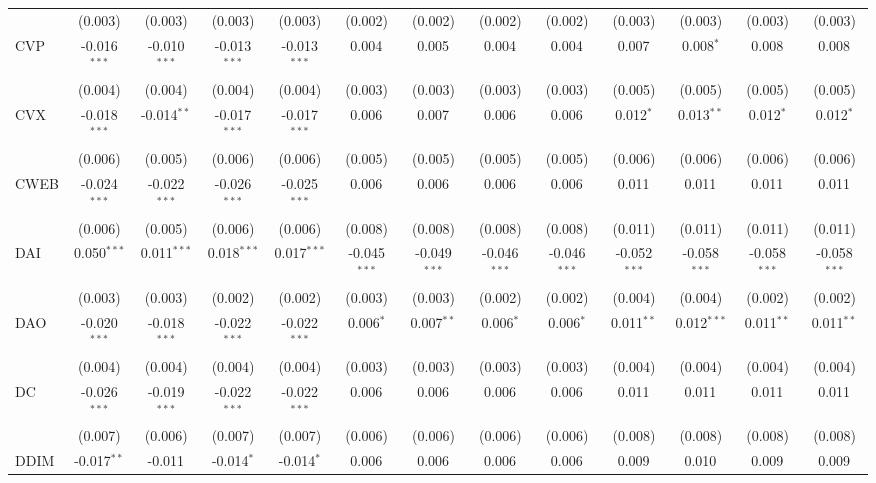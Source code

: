 \begin{table}[!htbp]
\begin{tabular}{@{\extracolsep{5pt}}lcccccccccccc}
  & (0.003) & (0.003) & (0.003) & (0.003) & (0.002) & (0.002) & (0.002) & (0.002) & (0.003) & (0.003) & (0.003) & (0.003) \\
 CVP & -0.016$^{***}$ & -0.010$^{***}$ & -0.013$^{***}$ & -0.013$^{***}$ & 0.004$^{}$ & 0.005$^{}$ & 0.004$^{}$ & 0.004$^{}$ & 0.007$^{}$ & 0.008$^{*}$ & 0.008$^{}$ & 0.008$^{}$ \\
  & (0.004) & (0.004) & (0.004) & (0.004) & (0.003) & (0.003) & (0.003) & (0.003) & (0.005) & (0.005) & (0.005) & (0.005) \\
 CVX & -0.018$^{***}$ & -0.014$^{**}$ & -0.017$^{***}$ & -0.017$^{***}$ & 0.006$^{}$ & 0.007$^{}$ & 0.006$^{}$ & 0.006$^{}$ & 0.012$^{*}$ & 0.013$^{**}$ & 0.012$^{*}$ & 0.012$^{*}$ \\
  & (0.006) & (0.005) & (0.006) & (0.006) & (0.005) & (0.005) & (0.005) & (0.005) & (0.006) & (0.006) & (0.006) & (0.006) \\
 CWEB & -0.024$^{***}$ & -0.022$^{***}$ & -0.026$^{***}$ & -0.025$^{***}$ & 0.006$^{}$ & 0.006$^{}$ & 0.006$^{}$ & 0.006$^{}$ & 0.011$^{}$ & 0.011$^{}$ & 0.011$^{}$ & 0.011$^{}$ \\
  & (0.006) & (0.005) & (0.006) & (0.006) & (0.008) & (0.008) & (0.008) & (0.008) & (0.011) & (0.011) & (0.011) & (0.011) \\
 DAI & 0.050$^{***}$ & 0.011$^{***}$ & 0.018$^{***}$ & 0.017$^{***}$ & -0.045$^{***}$ & -0.049$^{***}$ & -0.046$^{***}$ & -0.046$^{***}$ & -0.052$^{***}$ & -0.058$^{***}$ & -0.058$^{***}$ & -0.058$^{***}$ \\
  & (0.003) & (0.003) & (0.002) & (0.002) & (0.003) & (0.003) & (0.002) & (0.002) & (0.004) & (0.004) & (0.002) & (0.002) \\
 DAO & -0.020$^{***}$ & -0.018$^{***}$ & -0.022$^{***}$ & -0.022$^{***}$ & 0.006$^{*}$ & 0.007$^{**}$ & 0.006$^{*}$ & 0.006$^{*}$ & 0.011$^{**}$ & 0.012$^{***}$ & 0.011$^{**}$ & 0.011$^{**}$ \\
  & (0.004) & (0.004) & (0.004) & (0.004) & (0.003) & (0.003) & (0.003) & (0.003) & (0.004) & (0.004) & (0.004) & (0.004) \\
 DC & -0.026$^{***}$ & -0.019$^{***}$ & -0.022$^{***}$ & -0.022$^{***}$ & 0.006$^{}$ & 0.006$^{}$ & 0.006$^{}$ & 0.006$^{}$ & 0.011$^{}$ & 0.011$^{}$ & 0.011$^{}$ & 0.011$^{}$ \\
  & (0.007) & (0.006) & (0.007) & (0.007) & (0.006) & (0.006) & (0.006) & (0.006) & (0.008) & (0.008) & (0.008) & (0.008) \\
 DDIM & -0.017$^{**}$ & -0.011$^{}$ & -0.014$^{*}$ & -0.014$^{*}$ & 0.006$^{}$ & 0.006$^{}$ & 0.006$^{}$ & 0.006$^{}$ & 0.009$^{}$ & 0.010$^{}$ & 0.009$^{}$ & 0.009$^{}$ \\

\end{tabular}
\end{table}
